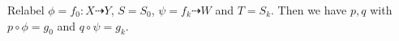 \documentclass[a4paper,12pt]{amsart}
\begin{document}
Relabel $\phi=f_{0}:X \dashrightarrow Y$, $S=S_{0}$, $\psi=f_{k}\dashrightarrow W$ and $T=S_{k}$. Then we have $p,q$ with $p \circ \phi=g_{0}$ and $q \circ \psi =g_{k}$.



%	
%
\end{document}
